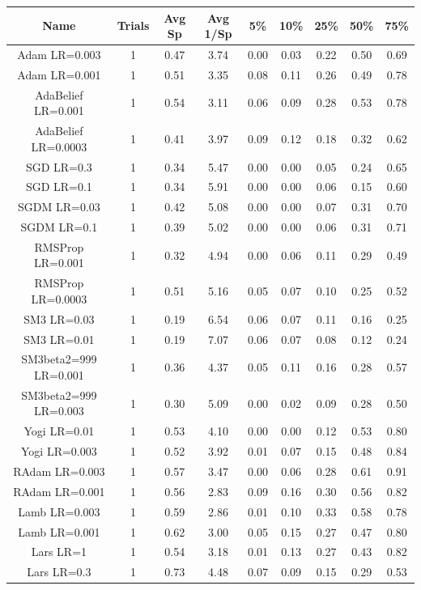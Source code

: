\footnotesize
\begin{tabular}{||c c c c c c c c c||} 
     \hline
     Name & Trials & Avg Sp & Avg 1/Sp & 5\% & 10\% & 25\% & 50\% & 75\%  \\ [0.5ex] 
     \hline\hline
Adam LR=0.003 & 1 &0.47 & 3.74 & 0.00 & 0.03 & 0.22 & 0.50 & 0.69 \\
Adam LR=0.001 & 1 &0.51 & 3.35 & 0.08 & 0.11 & 0.26 & 0.49 & 0.78 \\
AdaBelief LR=0.001 & 1 &0.54 & 3.11 & 0.06 & 0.09 & 0.28 & 0.53 & 0.78 \\
AdaBelief LR=0.0003 & 1 &0.41 & 3.97 & 0.09 & 0.12 & 0.18 & 0.32 & 0.62 \\
SGD LR=0.3 & 1 &0.34 & 5.47 & 0.00 & 0.00 & 0.05 & 0.24 & 0.65 \\
SGD LR=0.1 & 1 &0.34 & 5.91 & 0.00 & 0.00 & 0.06 & 0.15 & 0.60 \\
SGDM LR=0.03 & 1 &0.42 & 5.08 & 0.00 & 0.00 & 0.07 & 0.31 & 0.70 \\
SGDM LR=0.1 & 1 &0.39 & 5.02 & 0.00 & 0.00 & 0.06 & 0.31 & 0.71 \\
RMSProp LR=0.001 & 1 &0.32 & 4.94 & 0.00 & 0.06 & 0.11 & 0.29 & 0.49 \\
RMSProp LR=0.0003 & 1 &0.51 & 5.16 & 0.05 & 0.07 & 0.10 & 0.25 & 0.52 \\
SM3 LR=0.03 & 1 &0.19 & 6.54 & 0.06 & 0.07 & 0.11 & 0.16 & 0.25 \\
SM3 LR=0.01 & 1 &0.19 & 7.07 & 0.06 & 0.07 & 0.08 & 0.12 & 0.24 \\
SM3beta2=999 LR=0.001 & 1 &0.36 & 4.37 & 0.05 & 0.11 & 0.16 & 0.28 & 0.57 \\
SM3beta2=999 LR=0.003 & 1 &0.30 & 5.09 & 0.00 & 0.02 & 0.09 & 0.28 & 0.50 \\
Yogi LR=0.01 & 1 &0.53 & 4.10 & 0.00 & 0.00 & 0.12 & 0.53 & 0.80 \\
Yogi LR=0.003 & 1 &0.52 & 3.92 & 0.01 & 0.07 & 0.15 & 0.48 & 0.84 \\
RAdam LR=0.003 & 1 &0.57 & 3.47 & 0.00 & 0.06 & 0.28 & 0.61 & 0.91 \\
RAdam LR=0.001 & 1 &0.56 & 2.83 & 0.09 & 0.16 & 0.30 & 0.56 & 0.82 \\
Lamb LR=0.003 & 1 &0.59 & 2.86 & 0.01 & 0.10 & 0.33 & 0.58 & 0.78 \\
Lamb LR=0.001 & 1 &0.62 & 3.00 & 0.05 & 0.15 & 0.27 & 0.47 & 0.80 \\
Lars LR=1 & 1 &0.54 & 3.18 & 0.01 & 0.13 & 0.27 & 0.43 & 0.82 \\
Lars LR=0.3 & 1 &0.73 & 4.48 & 0.07 & 0.09 & 0.15 & 0.29 & 0.53 \\

\end{tabular}
